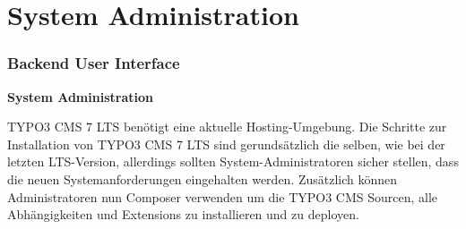 %

\section{System Administration}
\begin{frame}[fragile]
	\frametitle{Backend User Interface}

	\begin{center}\huge{\color{typo3darkgrey}\textbf{System Administration}}\end{center}

	TYPO3 CMS 7 LTS benötigt eine aktuelle Hosting-Umgebung. Die Schritte zur Installation
	von TYPO3 CMS 7 LTS sind gerundsätzlich die selben, wie bei der letzten LTS-Version,
	allerdings sollten System-Administratoren sicher stellen, dass die neuen
	Systemanforderungen eingehalten werden.\newline
	Zusätzlich können Administratoren nun Composer verwenden um die TYPO3 CMS Sourcen,
	alle Abhängigkeiten und Extensions zu installieren und zu deployen.

\end{frame}

